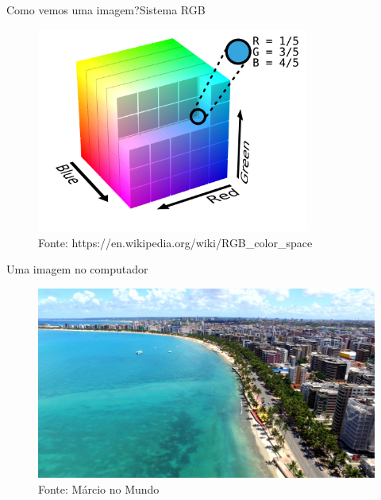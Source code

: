 \documentclass{beamer}
\begin{document}
\begin{frame}{Como vemos uma imagem?}{Sistema {\color{red}R}{\color{green}G}{\color{blue}B}}
    \begin{figure}
        \centering
        \includegraphics[width=0.8\textwidth]{figs/rgb-point.png}
        \caption{Fonte: https://en.wikipedia.org/wiki/RGB\_color\_space}
    \end{figure}
\end{frame}

\begin{frame}{Uma imagem no computador}
    \begin{figure}
        \centering   
        \includegraphics[width=\textwidth]{figs/maceio.jpg}
        \caption{Fonte: M\'arcio no Mundo}
    \end{figure}
\end{frame}
\end{document}
